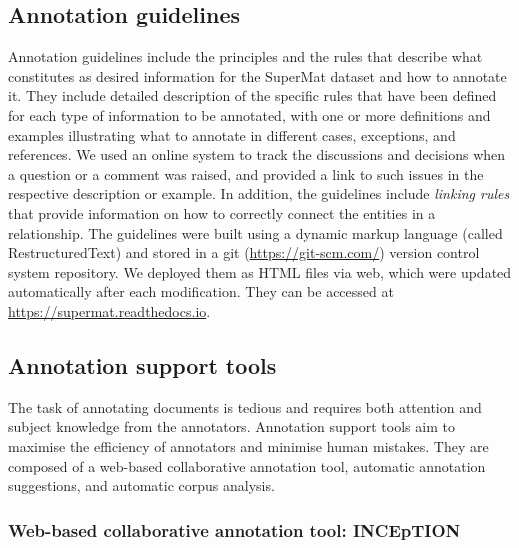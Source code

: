 \documentclass[]{interact}
\theoremstyle{plain}%
\theoremstyle{definition}
\theoremstyle{remark}
\begin{document}
\subsection{Annotation guidelines}
\label{subsec:annotation-guidelines}
Annotation guidelines include the principles and the rules that describe  what constitutes as desired information for the SuperMat dataset and how to annotate it. They include detailed description of the specific rules that have been defined for each type of information to be annotated, with one or more definitions and examples illustrating what to annotate in different cases, exceptions, and references. We used an online system to track the discussions and decisions when a question or a comment was raised, and provided a link to such issues in the respective description or example. 
In addition, the guidelines include \textit{linking rules} that provide information on how to correctly connect the entities in a relationship. 
The guidelines were built using a dynamic markup language (called RestructuredText) and stored in a git (\url{https://git-scm.com/}) version control system repository. We deployed them as HTML files via web, which were updated automatically after each modification. They can be accessed at \url{https://supermat.readthedocs.io}.

\subsection{Annotation support tools}
\label{subsec:annotation-support-tool}
The task of annotating documents is tedious and requires both attention and subject knowledge from the annotators.
Annotation support tools aim to maximise the efficiency of annotators and minimise human mistakes. 
They are composed of a web-based collaborative annotation tool, automatic annotation suggestions, and automatic corpus analysis. 

\subsubsection{Web-based collaborative annotation tool: INCEpTION}
\label{subsec:annotation-tool}
\end{document}
